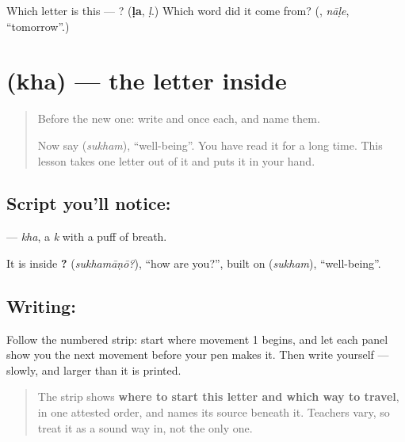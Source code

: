\begin{tcolorbox}[breakable,colback=teal!4,colframe=teal!35!black,title={Before you move on}]
Which letter is this — ? (\textbf{ḷa}, \emph{ḷ}.) Which word did it come from? (\textbf{}, \emph{nāḷe}, \textquotedblleft{}tomorrow\textquotedblright{}.)
\end{tcolorbox}
\section[\texorpdfstring{\ml{ഖ} (kha)}{ഖ (kha)}]{ (kha) — the letter inside }

\label{lesson:ML-W113-kha}



\begin{quote}
Before the new one: write  and  once each, and name them.

Now say \textbf{} (\emph{sukham}), \textquotedblleft{}well-being\textquotedblright{}. You have read it for a long time. This lesson takes one letter out of it and puts it in your hand.
\end{quote}

\subsection*{Script you'll notice: }
\textbf{} — \emph{kha}, a \emph{k} with a puff of breath.

It is inside \textbf{?} (\emph{sukhamāṇō?}), \textquotedblleft{}how are you?\textquotedblright{}, built on \textbf{} (\emph{sukham}), \textquotedblleft{}well-being\textquotedblright{}.

\subsection*{Writing: }

Follow the numbered strip: start where movement 1 begins, and let each panel show you the next movement before your pen makes it. Then write  yourself — slowly, and larger than it is printed.

\begin{quote}
The strip shows \textbf{where to start this letter and which way to travel}, in one attested order, and names its source beneath it. Teachers vary, so treat it as a sound way in, not the only one.
\end{quote}


